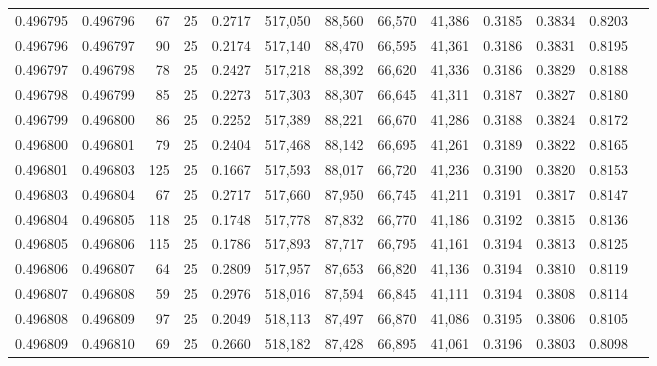 \begin{tabular}{rrrrrrrrrrrrr}
0.496795 & 0.496796 &    67 &  25 &                                     0.2717 & 517,050 &  88,560 &  66,570 &  41,386 & 0.3185 & 0.3834 & 0.8203 \\
0.496796 & 0.496797 &    90 &  25 &                                     0.2174 & 517,140 &  88,470 &  66,595 &  41,361 & 0.3186 & 0.3831 & 0.8195 \\
0.496797 & 0.496798 &    78 &  25 &                                     0.2427 & 517,218 &  88,392 &  66,620 &  41,336 & 0.3186 & 0.3829 & 0.8188 \\
0.496798 & 0.496799 &    85 &  25 &                                     0.2273 & 517,303 &  88,307 &  66,645 &  41,311 & 0.3187 & 0.3827 & 0.8180 \\
0.496799 & 0.496800 &    86 &  25 &                                     0.2252 & 517,389 &  88,221 &  66,670 &  41,286 & 0.3188 & 0.3824 & 0.8172 \\
0.496800 & 0.496801 &    79 &  25 &                                     0.2404 & 517,468 &  88,142 &  66,695 &  41,261 & 0.3189 & 0.3822 & 0.8165 \\
0.496801 & 0.496803 &   125 &  25 &                                     0.1667 & 517,593 &  88,017 &  66,720 &  41,236 & 0.3190 & 0.3820 & 0.8153 \\
0.496803 & 0.496804 &    67 &  25 &                                     0.2717 & 517,660 &  87,950 &  66,745 &  41,211 & 0.3191 & 0.3817 & 0.8147 \\
0.496804 & 0.496805 &   118 &  25 &                                     0.1748 & 517,778 &  87,832 &  66,770 &  41,186 & 0.3192 & 0.3815 & 0.8136 \\
0.496805 & 0.496806 &   115 &  25 &                                     0.1786 & 517,893 &  87,717 &  66,795 &  41,161 & 0.3194 & 0.3813 & 0.8125 \\
0.496806 & 0.496807 &    64 &  25 &                                     0.2809 & 517,957 &  87,653 &  66,820 &  41,136 & 0.3194 & 0.3810 & 0.8119 \\
0.496807 & 0.496808 &    59 &  25 &                                     0.2976 & 518,016 &  87,594 &  66,845 &  41,111 & 0.3194 & 0.3808 & 0.8114 \\
0.496808 & 0.496809 &    97 &  25 &                                     0.2049 & 518,113 &  87,497 &  66,870 &  41,086 & 0.3195 & 0.3806 & 0.8105 \\
0.496809 & 0.496810 &    69 &  25 &                                     0.2660 & 518,182 &  87,428 &  66,895 &  41,061 & 0.3196 & 0.3803 & 0.8098 \\

\end{tabular}
